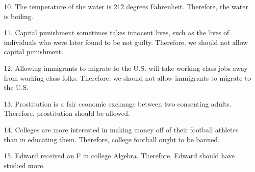 10. The temperature of the water is 212 degrees Fahrenheit. Therefore,
the water is boiling.

11. Capital punishment sometimes takes innocent lives, such as the lives
of individuals who were later found to be not guilty. Therefore, we
should not allow capital punishment.

12. Allowing immigrants to migrate to the U.S. will take working class jobs
away from working class folks. Therefore, we should not allow
immigrants to migrate to the U.S.

13. Prostitution is a fair economic exchange between two consenting
adults. Therefore, prostitution should be allowed.

14. Colleges are more interested in making money off of their football
athletes than in educating them. Therefore, college football ought to
be banned.

15. Edward received an F in college Algebra. Therefore, Edward should
have studied more.

